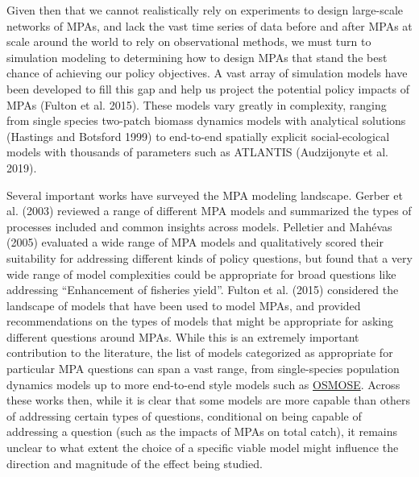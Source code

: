 \documentclass[
  default,
  lineno,
  referee]{sn-jnl}
\begin{document}
Given then that we cannot realistically rely on experiments to design
large-scale networks of MPAs, and lack the vast time series of data
before and after MPAs at scale around the world to rely on observational
methods, we must turn to simulation modeling to determining how to
design MPAs that stand the best chance of achieving our policy
objectives. A vast array of simulation models have been developed to
fill this gap and help us project the potential policy impacts of MPAs
(Fulton et al. 2015). These models vary greatly in complexity, ranging
from single species two-patch biomass dynamics models with analytical
solutions (Hastings and Botsford 1999) to end-to-end spatially explicit
social-ecological models with thousands of parameters such as ATLANTIS
(Audzijonyte et al. 2019).

Several important works have surveyed the MPA modeling landscape. Gerber
et al. (2003) reviewed a range of different MPA models and summarized
the types of processes included and common insights across models.
Pelletier and Mahévas (2005) evaluated a wide range of MPA models and
qualitatively scored their suitability for addressing different kinds of
policy questions, but found that a very wide range of model complexities
could be appropriate for broad questions like addressing ``Enhancement
of fisheries yield''. Fulton et al. (2015) considered the landscape of
models that have been used to model MPAs, and provided recommendations
on the types of models that might be appropriate for asking different
questions around MPAs. While this is an extremely important contribution
to the literature, the list of models categorized as appropriate for
particular MPA questions can span a vast range, from single-species
population dynamics models up to more end-to-end style models such as
\href{https://osmose-model.org/publications/}{OSMOSE}. Across these
works then, while it is clear that some models are more capable than
others of addressing certain types of questions, conditional on being
capable of addressing a question (such as the impacts of MPAs on total
catch), it remains unclear to what extent the choice of a specific
viable model might influence the direction and magnitude of the effect
being studied.
\end{document}
